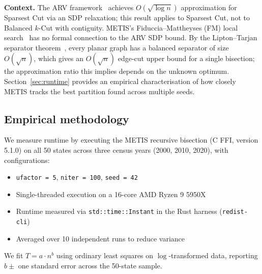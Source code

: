 \noindent\textbf{Context.}
The ARV framework~\citep{arora2009expander} achieves $O(\sqrt{\log n})$
approximation for Sparsest Cut via an SDP relaxation; this result applies
to Sparsest Cut, not to Balanced $k$-Cut with contiguity.
METIS's Fiduccia--Mattheyses (FM) local search~\citep{fiduccia1982linear}
has no formal connection to the ARV SDP bound.
By the Lipton--Tarjan separator theorem~\citep{lipton1979separator},
every planar graph has a balanced separator of size $O(\sqrt{n})$, which
gives an $O(\sqrt{n})$ edge-cut upper bound for a single bisection;
the approximation ratio this implies depends on the unknown optimum.
Section~\ref{sec:runtime} provides an empirical characterisation of how
closely METIS tracks the best partition found across multiple seeds.

\subsection{Empirical methodology}

We measure runtime by executing the METIS recursive bisection (C FFI,
version 5.1.0) on all 50 states across three census years (2000, 2010,
2020), with configurations:
\begin{itemize}
  \item \texttt{ufactor = 5}, \texttt{niter = 100}, \texttt{seed = 42}
  \item Single-threaded execution on a 16-core AMD Ryzen 9 5950X
  \item Runtime measured via \texttt{std::time::Instant} in the Rust
    harness (\texttt{redist-cli})
  \item Averaged over 10 independent runs to reduce variance
\end{itemize}

We fit $T = a \cdot n^b$ using ordinary least squares on $\log$-transformed
data, reporting $b \pm$ one standard error across the 50-state sample.
